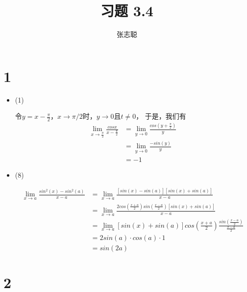 \documentclass{article}
\begin{document}
\title{习题 3.4}
\author{张志聪}
\maketitle

\section*{1}

\begin{itemize}
  \item (1)

        令$y = x - \frac{\pi}{2}$，$x \to \pi/2$时，$y \to 0$且$t \neq 0$，
        于是，我们有
        \begin{align*}
          \lim\limits_{x \to \frac{\pi}{2}} \frac{cosx}{x - \frac{\pi}{2}}
          & = \lim\limits_{y \to 0} \frac{cos(y + \frac{\pi}{2})}{y} \\
          & = \lim\limits_{y \to 0} \frac{-sin(y)}{y} \\
          & = -1
        \end{align*}

  \item (8)

        \begin{align*}
          \lim\limits_{x \to a} \frac{sin^2(x) - sin^2(a)}{x - a}
           & = \lim\limits_{x \to a} \frac{[sin(x) - sin(a)][sin(x) + sin(a)]}{x - a}                                \\
           & = \lim\limits_{x \to a} \frac{2cos(\frac{x+a}{2})sin(\frac{x-a}{2})[sin(x) + sin(a)]}{x - a}            \\
           & = \lim\limits_{x \to a} [sin(x) + sin(a)] cos(\frac{x+a}{2}) \frac{sin(\frac{x-a}{2})}{\frac{x - a}{2}} \\
           & = 2sin(a) \cdot cos(a) \cdot 1                                                                          \\
           & = sin(2a)
        \end{align*}
\end{itemize}

\section*{2}
\end{document}
